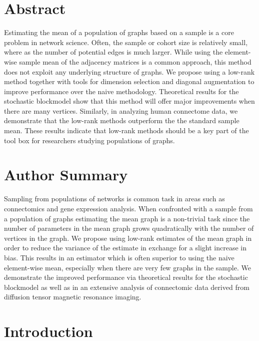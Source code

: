 \documentclass[10pt,letterpaper]{article}
\begin{document}
\section*{Abstract}
Estimating the mean of a population of graphs based on a sample is a core problem in network science.
Often, the sample or cohort size is relatively small, where as the number of potential edges is much larger. 
While using the element-wise sample mean of the adjacency matrices is a common approach, this method does not exploit any underlying structure of graphs.
We propose using a low-rank method together with tools for dimension selection and diagonal augmentation to improve performance over the naive methodology.
Theoretical results for the stochastic blockmodel show that this method will offer major improvements when there are many vertices.
Similarly, in analyzing human connectome data, we demonstrate that the low-rank methods outperform the the standard sample mean.
These results indicate that low-rank methods should be a key part of the tool box for researchers studying populations of graphs.



\section*{Author Summary}
Sampling from populations of networks is common task in areas such as connectomics and gene expression analysis.
When confronted with a sample from a population of graphs estimating the mean graph is a non-trivial task since the number of parameters in the mean graph grows quadratically with the number of vertices in the graph.
We propose using low-rank estimates of the mean graph in order to reduce the variance of the estimate in exchange for a slight increase in bias.
This results in an estimator which is often superior to using the naive element-wise mean, especially when there are very few graphs in the sample.
We demonstrate the improved performance via theoretical results for the stochastic blockmodel as well as in an extensive analysis of connectomic data derived from diffusion tensor magnetic resonance imaging.

\linenumbers



\section{Introduction}
\end{document}
